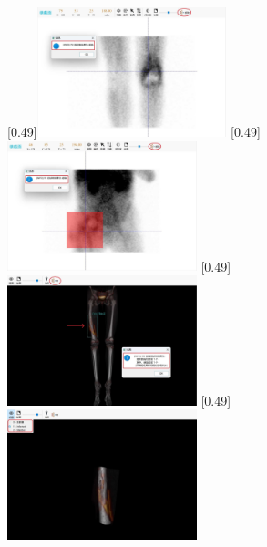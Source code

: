 \begin{figure}[htbp]
  \centering
  [0.49\textwidth]{\includegraphics[width=0.49\textwidth]{figures/chap05_example_result1.jpg}}
  [0.49\textwidth]{\includegraphics[width=0.49\textwidth]{figures/chap05_example_result2.jpg}}
  [0.49\textwidth]{\includegraphics[width=0.49\textwidth]{figures/chap05_example_result3.jpg}}
  [0.49\textwidth]{\includegraphics[width=0.49\textwidth]{figures/chap05_example_result4.jpg}}
  \label{fig:chap05_example_diagnose}
\end{figure}

